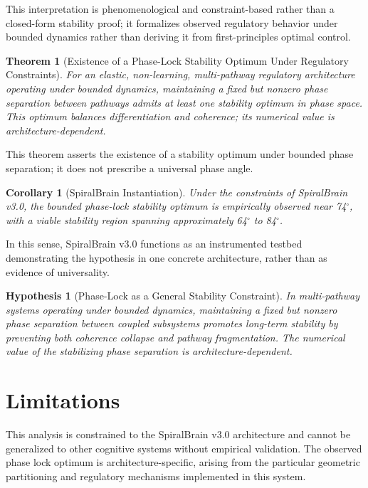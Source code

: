 \documentclass[12pt,a4paper]{report}
\newtheorem{theorem}{Theorem}
\newtheorem{corollary}{Corollary}
\newtheorem{hypothesis}{Hypothesis}
\begin{document}
This interpretation is phenomenological and constraint-based rather than a closed-form stability proof; it formalizes observed regulatory behavior under bounded dynamics rather than deriving it from first-principles optimal control.

\begin{theorem}[Existence of a Phase-Lock Stability Optimum Under Regulatory Constraints]
For an elastic, non-learning, multi-pathway regulatory architecture operating under bounded dynamics, maintaining a fixed but nonzero phase separation between pathways admits at least one stability optimum in phase space. This optimum balances differentiation and coherence; its numerical value is architecture-dependent.
\end{theorem}

This theorem asserts the existence of a stability optimum under bounded phase separation; it does not prescribe a universal phase angle.

\begin{corollary}[SpiralBrain Instantiation]
Under the constraints of SpiralBrain v3.0, the bounded phase-lock stability optimum is empirically observed near 74$^\circ$, with a viable stability region spanning approximately 64$^\circ$ to 84$^\circ$.
\end{corollary}

In this sense, SpiralBrain v3.0 functions as an instrumented testbed demonstrating the hypothesis in one concrete architecture, rather than as evidence of universality.

\begin{hypothesis}[Phase-Lock as a General Stability Constraint]
In multi-pathway systems operating under bounded dynamics, maintaining a fixed but
nonzero phase separation between coupled subsystems promotes long-term stability by
preventing both coherence collapse and pathway fragmentation. The numerical value of
the stabilizing phase separation is architecture-dependent.
\end{hypothesis}

\section{Limitations}

This analysis is constrained to the SpiralBrain v3.0 architecture and cannot be generalized to other cognitive systems without empirical validation. The observed phase lock optimum is architecture-specific, arising from the particular geometric partitioning and regulatory mechanisms implemented in this system.
\end{document}
